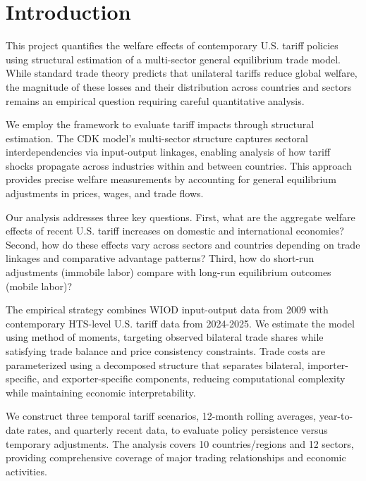 \section{Introduction}

This project quantifies the welfare effects of contemporary U.S. tariff policies using structural estimation of a multi-sector general equilibrium trade model. While standard trade theory predicts that unilateral tariffs reduce global welfare, the magnitude of these losses and their distribution across countries and sectors remains an empirical question requiring careful quantitative analysis.

We employ the \cite{costinot2012TheReviewofEconomicStudies} framework to evaluate tariff impacts through structural estimation. The CDK model's multi-sector structure captures sectoral interdependencies via input-output linkages, enabling analysis of how tariff shocks propagate across industries within and between countries. This approach provides precise welfare measurements by accounting for general equilibrium adjustments in prices, wages, and trade flows.

Our analysis addresses three key questions. First, what are the aggregate welfare effects of recent U.S. tariff increases on domestic and international economies? Second, how do these effects vary across sectors and countries depending on trade linkages and comparative advantage patterns? Third, how do short-run adjustments (immobile labor) compare with long-run equilibrium outcomes (mobile labor)?

The empirical strategy combines WIOD input-output data from 2009 with contemporary HTS-level U.S. tariff data from 2024-2025. We estimate the model using method of moments, targeting observed bilateral trade shares while satisfying trade balance and price consistency constraints. Trade costs are parameterized using a decomposed structure that separates bilateral, importer-specific, and exporter-specific components, reducing computational complexity while maintaining economic interpretability.

We construct three temporal tariff scenarios, 12-month rolling averages, year-to-date rates, and quarterly recent data, to evaluate policy persistence versus temporary adjustments. The analysis covers 10 countries/regions and 12 sectors, providing comprehensive coverage of major trading relationships and economic activities.

